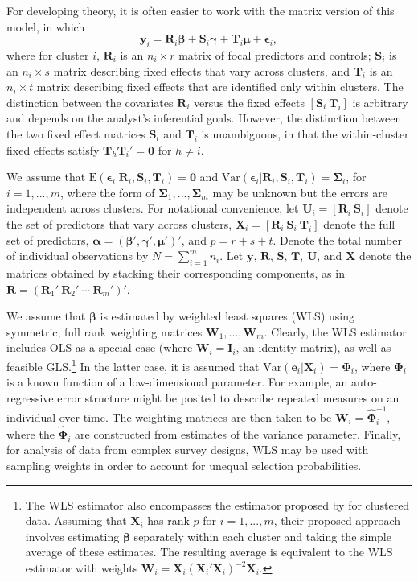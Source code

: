 \documentclass[12pt]{article}\usepackage[]{graphicx}\usepackage[]{color}
\newcommand{\E}{\text{E}}
\newcommand{\Var}{\text{Var}}
\newcommand{\bm}{\mathbf}
\newcommand{\bs}{\boldsymbol}
\begin{document}
For developing theory, it is often easier to work with the matrix version of this model, in which
\begin{equation}
\label{eq:fixed_effects}
\bm{y}_i = \bm{R}_i \bs\beta + \bm{S}_i \bs\gamma + \bm{T}_i \bs\mu + \bs\epsilon_i,
\end{equation}
where for cluster $i$, $\bm{R}_i$ is an $n_i \times r$ matrix of focal predictors and controls; $\bm{S}_i$ is an $n_i \times s$ matrix describing fixed effects that vary across clusters, and $\bm{T}_i$ is an $n_i \times t$ matrix describing fixed effects that are identified only within clusters. The distinction between the covariates $\bm{R}_i$ versus the fixed effects $\left[\bm{S}_i \ \bm{T}_i\right]$ is arbitrary and depends on the analyst's inferential goals. However, the distinction between the two fixed effect matrices $\bm{S}_i$ and $\bm{T}_i$ is unambiguous, in that the within-cluster fixed effects satisfy $\bm{T}_h \bm{T}_i' = \bm{0}$ for $h \neq i$. 

We assume that $\E\left(\bs\epsilon_i\left|\bm{R}_i,\bm{S}_i, \bm{T}_i\right.\right) = \bm{0}$ and $\Var\left(\bs\epsilon_i\left|\bm{R}_i,\bm{S}_i,\bm{T}_i\right.\right) = \bs\Sigma_i$, for $i = 1,...,m$, where the form of $\bs\Sigma_1,...,\bs\Sigma_m$ may be unknown but the errors are independent across clusters. 
For notational convenience, let $\bm{U}_i = \left[\bm{R}_i \ \bm{S}_i \right]$ denote the set of predictors that vary across clusters, $\bm{X}_i = \left[\bm{R}_i \ \bm{S}_i \ \bm{T}_i \right]$ denote the full set of predictors, $\bs\alpha = \left(\bs\beta', \bs\gamma', \bs\mu' \right)'$, and $p = r + s + t$.
Denote the total number of individual observations by $N = \sum_{i=1}^m n_i$.
Let $\bm{y}$, $\bm{R}$, $\bm{S}$, $\bm{T}$, $\bm{U}$, and $\bm{X}$ denote the matrices obtained by stacking their corresponding components, as in $\bm{R} = \left(\bm{R}_1' \ \bm{R}_2' \ \cdots \ \bm{R}_m'\right)'$. 

We assume that $\bs\beta$ is estimated by weighted least squares (WLS) using symmetric, full rank weighting matrices $\bm{W}_1,...,\bm{W}_m$. 
Clearly, the WLS estimator includes OLS as a special case (where $\bm{W}_i = \bm{I}_i$, an identity matrix), as well as feasible GLS.\footnote{
The WLS estimator also encompasses the estimator proposed by \citet{Ibragimov2010tstatistic} for clustered data. 
Assuming that $\bm{X}_i$ has rank $p$ for $i = 1,...,m$, their proposed approach involves estimating $\bs\beta$ separately within each cluster and taking the simple average of these estimates. 
The resulting average is equivalent to the WLS estimator with weights $\bm{W}_i = \bm{X}_i \left(\bm{X}_i'\bm{X}_i\right)^{-2} \bm{X}_i$.} 
In the latter case, it is assumed that $\Var\left(\bm{e}_i\left|\bm{X}_i\right.\right) = \bs\Phi_i$, where $\bs\Phi_i$ is a known function of a low-dimensional parameter. 
For example, an auto-regressive error structure might be posited to describe repeated measures on an individual over time. 
The weighting matrices are then taken to be $\bm{W}_i = \hat{\bs\Phi}_i^{-1}$, where the $\hat{\bs\Phi}_i$ are constructed from estimates of the variance parameter.
Finally, for analysis of data from complex survey designs, WLS may be used with sampling weights in order to account for unequal selection probabilities.
\end{document}
